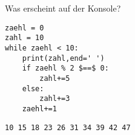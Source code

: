 \question[4] Was erscheint auf der Konsole?
\begin{lstlisting}
zaehl = 0
zahl = 10
while zaehl < 10:
    print(zahl,end=' ')
    if zaehl % 2 $==$ 0:
        zahl+=5
    else:
        zahl+=3
    zaehl+=1
\end{lstlisting}
\begin{solutionbox}{1cm}
\texttt{10 15 18 23 26 31 34 39 42 47 }
\end{solutionbox}
